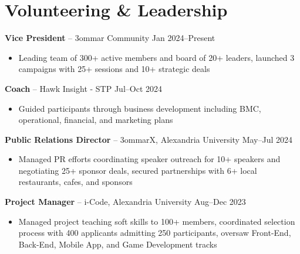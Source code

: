 \documentclass[11pt,a4paper]{article}
\begin{document}
\section*{Volunteering \& Leadership}

\textbf{Vice President} -- 3ommar Community \hfill Jan 2024--Present
\begin{itemize}[leftmargin=0.5cm, itemsep=1pt, topsep=2pt, label={-}]
    \item Leading team of 300+ active members and board of 20+ leaders, launched 3 campaigns with 25+ sessions and 10+ strategic deals
\end{itemize}

\vspace{4pt}

\textbf{Coach} -- Hawk Insight - STP \hfill Jul--Oct 2024
\begin{itemize}[leftmargin=0.5cm, itemsep=1pt, topsep=2pt, label={-}]
    \item Guided participants through business development including BMC, operational, financial, and marketing plans
\end{itemize}

\vspace{4pt}

\textbf{Public Relations Director} -- 3ommarX, Alexandria University \hfill May--Jul 2024
\begin{itemize}[leftmargin=0.5cm, itemsep=1pt, topsep=2pt, label={-}]
    \item Managed PR efforts coordinating speaker outreach for 10+ speakers and negotiating 25+ sponsor deals, secured partnerships with 6+ local restaurants, cafes, and sponsors
\end{itemize}

\vspace{4pt}

\textbf{Project Manager} -- i-Code, Alexandria University \hfill Aug--Dec 2023
\begin{itemize}[leftmargin=0.5cm, itemsep=1pt, topsep=2pt, label={-}]
    \item Managed project teaching soft skills to 100+ members, coordinated selection process with 400 applicants admitting 250 participants, oversaw Front-End, Back-End, Mobile App, and Game Development tracks
\end{itemize}
\end{document}
